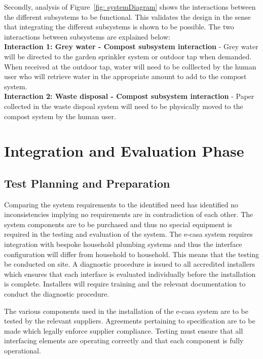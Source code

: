 \documentclass[a4paper,11pt,fleqn]{report}
\begin{document}
Secondly, analysis of Figure~\ref{fig: systemDiagram} shows the interactions between the different subsystems to be functional. This validates the design in the sense that integrating the different subsystems is shown to be possible. The two interactions between subsystems are explained below:\\

\textbf{Interaction 1: Grey water - Compost subsystem interaction} - Grey water will be directed to the garden sprinkler system or outdoor tap when demanded. When received at the outdoor tap, water will need to be colllected by the human user who will retrieve water in the appropriate amount to add to the compost system.\\

\textbf{Interaction 2: Waste disposal - Compost subsystem interaction} - Paper collected in the waste dispoal system will need to be physically moved to the compost system by the human user.

\section{Integration and Evaluation Phase}

\subsection{Test Planning and Preparation}
Comparing the system requirements to the identified need has identified no inconsistencies implying no requirements are in contradiction of each other. The system components are to be purchased and thus no special equipment is required in the testing and evaluation of the system. The e-casa system requires integration with bespoke household plumbing systems and thus the interface configuration will differ from household to household. This means that the testing be conducted on site. A diagnostic procedure is issued to all accredited installers which ensures that each interface is evaluated individually before the installation is complete. Installers will require training and the relevant documentation to conduct the diagnostic procedure.
					
The various components used in the installation of the e-casa system are to be tested by the relevant suppliers. Agreements pertaining to specification are to be made which legally enforce supplier compliance. Testing must ensure that all interfacing elements are operating correctly and that each component is fully operational.
\end{document}
